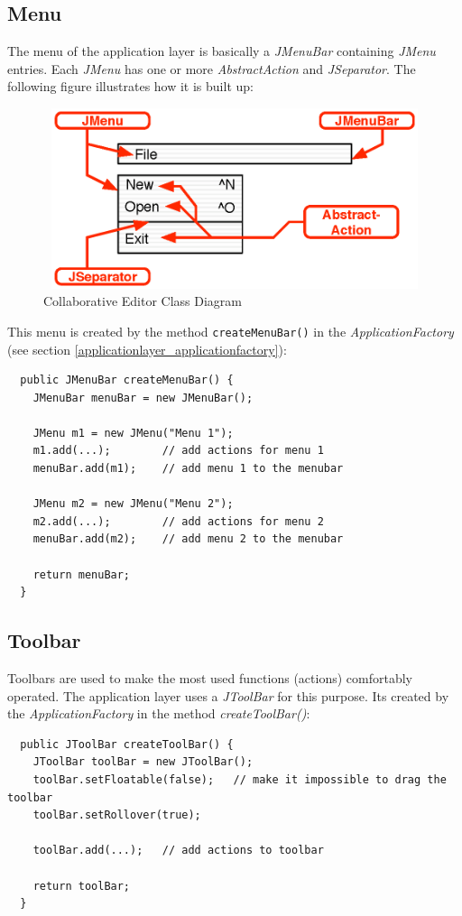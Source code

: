 \subsection{Menu}
The menu of the application layer is basically a \textit{JMenuBar} containing \textit{JMenu} entries. Each \textit{JMenu} has one or more \textit{AbstractAction} and \textit{JSeparator}. The following figure illustrates how it is built up:
\begin{figure}[H]
\begin{center}
  \includegraphics[height= 2.08in, width= 4.85in]{../images/finalreport/application_menu.eps}
\caption{Collaborative Editor Class Diagram}
\label{application_menu}
\end{center}
\end{figure}
This menu is created by the method \texttt{createMenuBar()} in the \textit{ApplicationFactory} (see section \ref{applicationlayer_applicationfactory}):
\begin{verbatim}
  public JMenuBar createMenuBar() {
    JMenuBar menuBar = new JMenuBar();

    JMenu m1 = new JMenu("Menu 1");
    m1.add(...);        // add actions for menu 1
    menuBar.add(m1);    // add menu 1 to the menubar
    
    JMenu m2 = new JMenu("Menu 2");
    m2.add(...);        // add actions for menu 2
    menuBar.add(m2);    // add menu 2 to the menubar
    
    return menuBar;
  }
\end{verbatim}

\subsection{Toolbar}
Toolbars are used to make the most used functions (actions) comfortably operated. The application layer uses a \textit{JToolBar} for this purpose. Its created by the \textit{ApplicationFactory} in the method \textit{createToolBar()}:
\begin{verbatim}
  public JToolBar createToolBar() {
    JToolBar toolBar = new JToolBar();
    toolBar.setFloatable(false);   // make it impossible to drag the toolbar
    toolBar.setRollover(true);

    toolBar.add(...);   // add actions to toolbar

    return toolBar;
  }
\end{verbatim}


